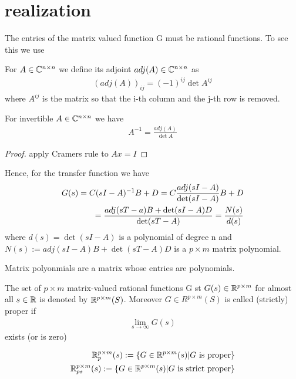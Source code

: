 \section{realization} 

The entries of the matrix valued function G must be rational functions. To see this we use

\begin{defi}
	For $A \in \mathbb{C}^{n \times n}$ we define its adjoint $adj(A) \in \mathbb{C}^{n \times n}$ as
	\begin{align*}
		(adj(A))_{ij}= (-1)^{ij} \det A^{ij}
	\end{align*}
	where $A^{ij}$ is the matrix so that the i-th column and the j-th row is removed. 
\end{defi}

\begin{thm}
	For invertible $A \in \mathbb{C}^{n \times n } $ we have 
	\begin{align*}
		A^{-1}= \frac{adj(A)}{\det A}
	\end{align*} 
\end{thm}
\begin{proof}
	apply Cramers rule to $Ax=I$
\end{proof}

Hence, for the transfer function we have 
\begin{align}
\label{eq:N(s)}
	G(s)=C(sI-A)^{-1}B+D= C \frac{adj(sI-A)}{\det (sI-A)} B + D \notag \\
	= \frac{adj(sT-a)B+\det (sI-A) D}{\det (sT-A)}= \frac{N(s)}{d(s)}
\end{align}
where $d(s)=\det(sI-A)$ is a polynomial of degree n and $N(s):= adj(sI-A)B+\det(sT-A)D$ is a $p \times m$ matrix polynomial. 

Matrix polyonmials are a matrix whose entries are polynomials. 

\begin{defi}
	The set of $p \times m$ matrix-valued rational functions G st $G(s) \in \mathbb{R}^{p \times m}$ for almost all $s \in \mathbb{R} $ is denoted by $\mathbb{R}^{p \times m}(S)$. Moreover $G \in R^{p \times m}(S)$ is called (strictly) proper if \begin{align*}
		\lim\limits_{s \rightarrow \infty} G(s)
	\end{align*}
	exists (or is zero) 
\end{defi}

\begin{align*}
	\mathbb{R}^{p \times m}_p(s):= \{G \in \mathbb{R}^{p \times m}(s)| G \text{ is proper} \} \\
	\mathbb{R}^{p \times m}_{ps}(s):= \{G \in \mathbb{R}^{p \times m}(s)| G \text{ is strict proper} \} 
\end{align*}

